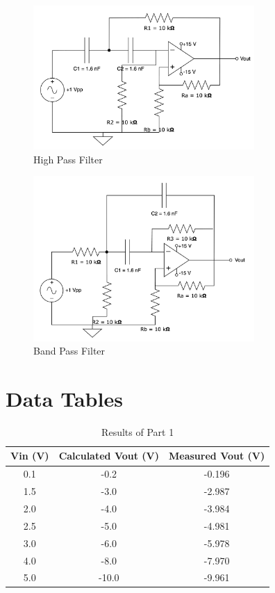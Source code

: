\documentclass[CMPE]{KGCOEReport}
\begin{document}
\begin{figure}[H]
    \centering
    \includegraphics[width=0.75\textwidth]{7.png}
    \caption{High Pass Filter}
    \label{fig:part7}
\end{figure}

\begin{figure}[H]
    \centering
    \includegraphics[width=0.75\textwidth]{8.png}
    \caption{Band Pass Filter}
    \label{fig:part8}
\end{figure}

\section*{Data Tables}

\begin{table}[H]
    \centering
    \caption{Results of Part 1}
    \begin{tabular}{|c|c|c|}
        \hline
        Vin (V) & Calculated Vout (V) & Measured Vout (V) \\
        \hline
        0.1 & -0.2 & -0.196 \\
        \hline
        1.5 & -3.0 & -2.987 \\
        \hline
        2.0 & -4.0 & -3.984 \\
        \hline
        2.5 & -5.0 & -4.981 \\
        \hline
        3.0 & -6.0 & -5.978 \\
        \hline
        4.0 & -8.0 & -7.970 \\
        \hline
        5.0 & -10.0 & -9.961 \\
        \hline
    \end{tabular}
\end{table}
\end{document}
